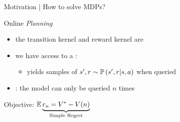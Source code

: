 \documentclass{beamer}
\begin{document}
\begin{frame}{Motivation | How to solve MDPs?}


\begin{exampleblock}{Online \emph{Planning}}
\begin{itemize}
    \item the transition kernel and reward kernel are 
    \item we have access to a : 
    \begin{itemize}
        \item[\incarrow] yields samples of $s', r \sim \mathbb{P}\left(s',r|s,a\right)$ when queried
    \end{itemize}
    \item {}: the model can only be queried $n$ times
\end{itemize}
\begin{center}
Objective:  $\operatorname*{\mathbb{E}} \underbrace{r_n = V^* - V(n)}_{\text{Simple Regret}}$
\end{center}
\end{exampleblock}
\end{frame}
\end{document}
